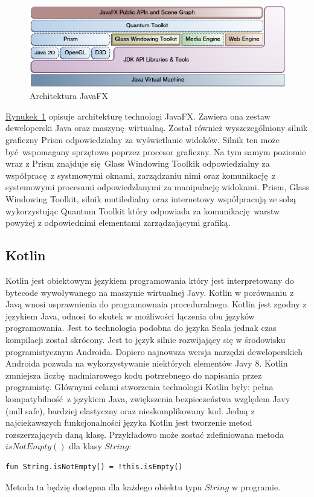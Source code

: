   \begin{figure}[h]
    \center
    \includegraphics[scale=0.6]{../image/fx_arch.png}
    \caption{Architektura JavaFX}
    \label{fig:fx_arch}
  \end{figure}

\hyperref[fig:java_arch]{Rynukek~\ref*{fig:fx_arch}} opisuje architekturę technologi JavaFX. Zawiera ona zestaw deweloperski Java oraz maszynę wirtualną. Został również wyszczególniony silnik graficzny Prism odpowiedzialny za wyświetlanie widoków. Silnik ten może być wspomagany sprzętowo poprzez procesor graficzny. Na tym samym poziomie wraz z Prism znajduje się Glass Windowing Toolkik odpowiedzialny za współpracę z systmowymi oknami, zarządzaniu nimi oraz komunikację z systemowymi procesami odpowiedzlanymi za manipulację widokami. Prism, Glass Windowing Toolkit, silnik mutiledialny oraz internetowy współpracują ze sobą wykorzystując Quantum Toolkit który odpowiada za komunikację warstw powyżej z odpowiednimi elementami zarządzającymi grafiką.

\subsection{Kotlin}
Kotlin jest obiektowym językiem programowania który jest interpretowany do bytecode wywoływanego na maszynie wirtualnej Javy. Kotlin w porównaniu z Javą wnosi usprawnienia do programownaia proceduralnego. Kotlin jest zgodny z językiem Java, odnosi to skutek w możliwości łączenia obu języków programowania. Jest to technologia podobna do języka Scala jednak czas kompilacji został skrócony. Jest to język silnie rozwijający się w środowisku programistycznym Androida. Dopiero najnowsza wersja narzędzi deweloperskich Androida pozwala na wykorzystywanie niektórych elementów Javy 8. Kotlin zmniejsza liczbę nadmiarowego kodu potrzebnego do napisania przez programistę. Głównymi celami stworzenia technologii Kotlin były: pełna kompatybilność z językiem Java, zwiększenia bezpieczeństwa względem Javy (null safe), bardziej elastyczny oraz nieskomplikowany kod. Jedną z najciekawszych funkcjonalności języka Kotlin jest tworzenie metod rozszerzających daną klasę. Przykładowo może zostać zdefiniowana metoda $isNotEmpty()$ dla klasy $String$:
\lstset{language=Java}
\begin{lstlisting}[frame=single]
  fun String.isNotEmpty() = !this.isEmpty()
\end{lstlisting}
Metoda ta będzię dostępna dla każdego obiektu typu $String$ w programie.
